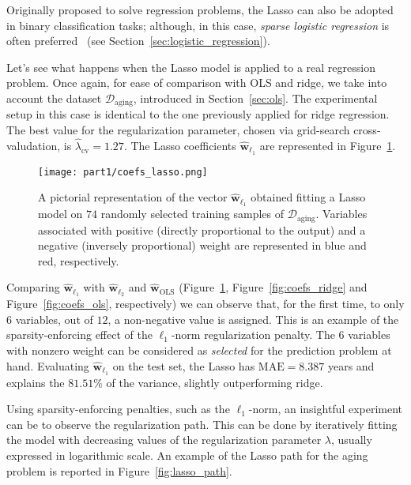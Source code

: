 			Originally proposed to solve regression problems, the Lasso can also be adopted in binary classification tasks; although, in this case, \textit{sparse logistic regression} is often preferred~\cite{tong2009genome} (see Section~\eqref{sec:logistic_regression}).

			Let's see what happens when the Lasso model is applied to a real regression problem. Once again, for ease of comparison with OLS and ridge, we take into account the dataset $\mathcal{D}_{\text{aging}}$, introduced in Section~\ref{sec:ols}. The experimental setup in this case is identical to the one previously applied for ridge regression. The best value for the regularization parameter, chosen via grid-search cross-valudation, is $\hat \lambda_{\text{cv}}=1.27$. The Lasso coefficients $\bm{ \hat w}_{\ell_1}$ are represented in Figure~\ref{fig:coefs_lasso}.

			\begin{figure}[]
				\centering
				\texttt{[image: part1/coefs\_lasso.png]}
				\caption{A pictorial representation of the vector $\bm{\hat w}_{\ell_1}$ obtained fitting a Lasso model on $74$ randomly selected training samples of $\mathcal{D}_{\text{aging}}$. Variables associated with positive (\ie directly proportional to the output) and a negative (\ie inversely proportional) weight are represented in blue and red, respectively.} \label{fig:coefs_lasso}
			\end{figure}
		
			Comparing $\bm{\hat w}_{\ell_1}$ with $\bm{\hat w}_{\ell_2}$ and $\bm{\hat w}_{\text{OLS}}$ (Figure~\ref{fig:coefs_lasso}, Figure~\ref{fig:coefs_ridge} and Figure~\ref{fig:coefs_ols}, respectively) we can observe that, for the first time, to only $6$ variables, out of $12$, a non-negative value is assigned. This is an example of the sparsity-enforcing effect of the $\ell_1$-norm regularization penalty.
			The $6$ variables with nonzero weight can be considered as \textit{selected} for the prediction problem at hand.
			Evaluating $\bm{\hat w}_{\ell_1}$ on the test set, the Lasso has  $\text{MAE}=8.387$ years and explains the $81.51\%$ of the variance, slightly outperforming ridge.

			Using sparsity-enforcing penalties, such as the $\ell_1$-norm, an insightful experiment can be to observe the regularization path. This can be done by iteratively fitting the model with decreasing values of the regularization parameter $\lambda$, usually expressed in logarithmic scale. An example of the Lasso path for the aging problem is reported in Figure~\ref{fig:lasso_path}.

